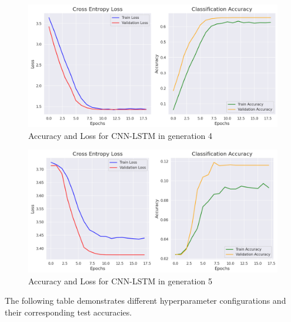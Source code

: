 \begin{figure}[h!]
      \centering
      \includegraphics[scale=0.18]{images/GA_CNN_LSTM_4.png}
      \caption{Accuracy and Loss for CNN-LSTM in generation 4}
  \end{figure}
\begin{figure}[h!]
      \centering
      \includegraphics[scale=0.18]{images/GA_CNN_LSTM_5.png}
      \caption{Accuracy and Loss for CNN-LSTM in generation 5}
  \end{figure}

\newpage
The following table demonstrates different hyperparameter configurations and their corresponding test accuracies.

\begin{table}[h!]
      \centering
      \caption{Hyperparameter configurations and test accuracies for CNN-LSTM}
      \label{tab:cnn_lstm_results}
\end{table}


